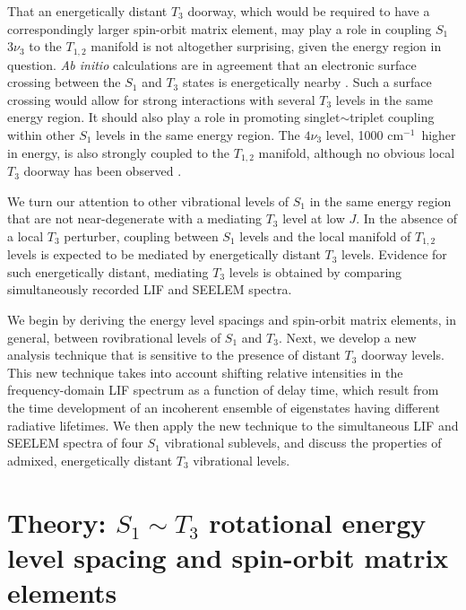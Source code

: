 \documentclass[12pt]{mitthesis}
\newcommand{\rcm}{cm$^{-1}$}
\begin{document}
That an energetically distant $T_3$ doorway, which would be required
to have a correspondingly larger spin-orbit matrix element, may play a
role in coupling $S_1$ $3 \nu_3$ to the $T_{1,2}$ manifold is not
altogether surprising, given the energy region in question.  \emph{Ab
  initio} calculations are in agreement that an electronic surface
crossing between the $S_1$ and $T_3$ states is energetically nearby
\cite{ventura03, thom07}.  Such a surface crossing would allow for
strong interactions with several $T_3$ levels in the same energy
region.  It should also play a role in promoting singlet$\sim$triplet
coupling within other $S_1$ levels in the same energy region.  The
$4\nu_3$ level, 1000 \rcm\ higher in energy, is also strongly coupled
to the $T_{1,2}$ manifold, although no obvious local $T_3$ doorway has
been observed \cite{drabbels94, ochi91}.  

We turn our attention to other vibrational levels of $S_1$ in the same
energy region that are not near-degenerate with a mediating $T_3$
level at low $J$.  In the absence of a local $T_3$ perturber, coupling
between $S_1$ levels and the local manifold of $T_{1,2}$ levels is
expected to be mediated by energetically distant $T_3$ levels.
Evidence for such energetically distant, mediating $T_3$ levels is
obtained by comparing simultaneously recorded LIF and SEELEM spectra.

We begin by deriving the energy level spacings and spin-orbit matrix
elements, in general, between rovibrational levels of $S_1$ and $T_3$.
Next, we develop a new analysis technique that is sensitive to the
presence of distant $T_3$ doorway levels.  This new technique takes
into account shifting relative intensities in the frequency-domain LIF
spectrum as a function of delay time, which result from the time
development of an incoherent ensemble of eigenstates having different
radiative lifetimes.  We then apply the new technique to the
simultaneous LIF and SEELEM spectra of four $S_1$ vibrational
sublevels, and discuss the properties of admixed, energetically
distant $T_3$ vibrational levels.

\section{Theory: $S_1 \sim T_3$ rotational energy level spacing and
  spin-orbit matrix elements}
\label{theory1}
\end{document}

